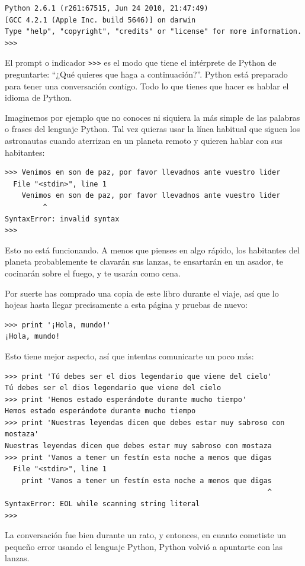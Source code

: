
\beforeverb
\begin{verbatim}
Python 2.6.1 (r261:67515, Jun 24 2010, 21:47:49) 
[GCC 4.2.1 (Apple Inc. build 5646)] on darwin
Type "help", "copyright", "credits" or "license" for more information.
>>> 
\end{verbatim}
\afterverb
%
El prompt o indicador {\tt >>>} es el modo que tiene el intérprete de Python de preguntarte:
``¿Qué quieres que haga a continuación?''. Python está preparado para tener una conversación contigo. Todo lo que tienes que hacer es hablar el idioma de Python.

Imaginemos por ejemplo que no conoces ni siquiera la más simple de las palabras o frases del lenguaje Python. Tal vez quieras usar la línea habitual que siguen los astronautas cuando aterrizan en un planeta remoto y quieren hablar con sus habitantes:

\beforeverb
\begin{verbatim}
>>> Venimos en son de paz, por favor llevadnos ante vuestro lider
  File "<stdin>", line 1
    Venimos en son de paz, por favor llevadnos ante vuestro lider
         ^
SyntaxError: invalid syntax
>>> 
\end{verbatim}
\afterverb
%
Esto no está funcionando. A menos que pienses en algo rápido,
los habitantes del planeta probablemente te clavarán sus lanzas,
te ensartarán en un asador, te cocinarán sobre el fuego, y te usarán como cena.

Por suerte has comprado una copia de este libro durante el viaje, así que lo hojeas
hasta llegar precisamente a esta página y pruebas de nuevo:

\beforeverb
\begin{verbatim}
>>> print '¡Hola, mundo!'
¡Hola, mundo!
\end{verbatim}
\afterverb
%
Esto tiene mejor aspecto, así que intentas comunicarte un poco
más:

\beforeverb
\begin{verbatim}
>>> print 'Tú debes ser el dios legendario que viene del cielo'
Tú debes ser el dios legendario que viene del cielo
>>> print 'Hemos estado esperándote durante mucho tiempo'
Hemos estado esperándote durante mucho tiempo
>>> print 'Nuestras leyendas dicen que debes estar muy sabroso con mostaza'
Nuestras leyendas dicen que debes estar muy sabroso con mostaza
>>> print 'Vamos a tener un festín esta noche a menos que digas
  File "<stdin>", line 1
    print 'Vamos a tener un festín esta noche a menos que digas
                                                              ^
SyntaxError: EOL while scanning string literal
>>> 
\end{verbatim}
\afterverb
%
La conversación fue bien durante un rato, y entonces, en cuanto
cometiste un pequeño error usando el lenguaje Python, Python
volvió a apuntarte con las lanzas.


